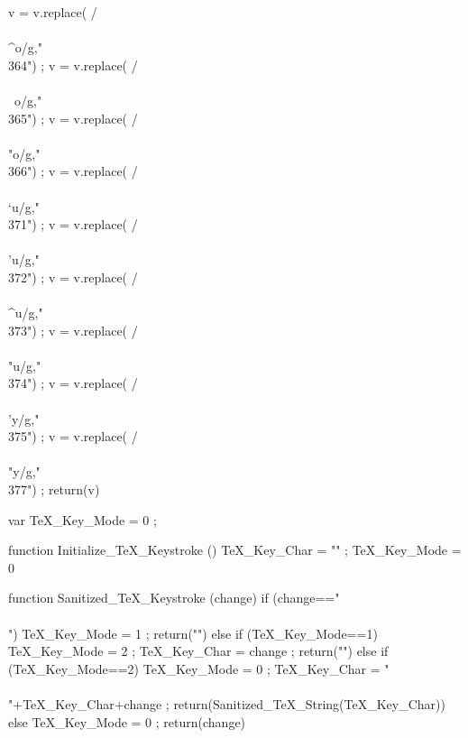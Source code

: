 {      v = v.replace(  /\\\\^o/g,"\\364") ;
      v = v.replace(  /\\\\~o/g,"\\365") ;
      v = v.replace(  /\\\\"o/g,"\\366") ;
      v = v.replace(  /\\\\`u/g,"\\371") ;
      v = v.replace(  /\\\\'u/g,"\\372") ;
      v = v.replace(  /\\\\^u/g,"\\373") ;
      v = v.replace(  /\\\\"u/g,"\\374") ;
      v = v.replace(  /\\\\'y/g,"\\375") ;
      v = v.replace(  /\\\\"y/g,"\\377") ;
      return(v) }

  var TeX_Key_Mode = 0 ; 

  function Initialize_TeX_Keystroke ()
    { TeX_Key_Char = "" ;
      TeX_Key_Mode = 0 }

  function Sanitized_TeX_Keystroke (change)
    { if (change=="\\\\")
        { TeX_Key_Mode = 1 ;
          return("") }
      else if (TeX_Key_Mode==1) 
        { TeX_Key_Mode = 2 ;
          TeX_Key_Char = change ;
          return("") } 
      else if (TeX_Key_Mode==2)
        { TeX_Key_Mode = 0 ;
          TeX_Key_Char = "\\\\"+TeX_Key_Char+change ;
          return(Sanitized_TeX_String(TeX_Key_Char)) } 
      else 
        { TeX_Key_Mode = 0 ;
          return(change) } }    

